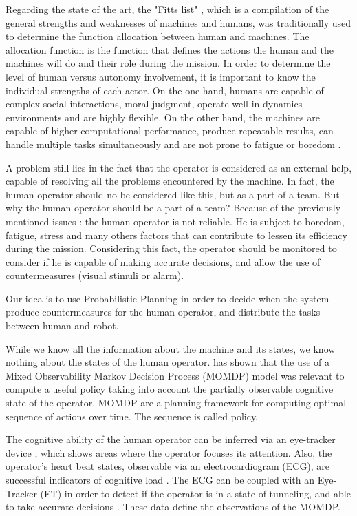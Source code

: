 \documentclass[conference]{IEEEtran}
\begin{document}
Regarding the state of the art, the "Fitts list" \cite{FITTS}, 
which is a compilation of the general strengths and weaknesses of machines and humans, 
was traditionally used to determine the function allocation between human and machines. 
The allocation function is the function that defines the actions the human and the machines will do and their role during the mission. 
In order to determine the level of human versus autonomy involvement, it is important to know the individual strengths of each actor. On the one hand, humans are capable of complex social interactions, moral judgment, operate well in dynamics environments and are highly flexible. On the other hand, the machines are capable of higher computational performance, produce repeatable results, can handle multiple tasks simultaneously and are not prone to fatigue or boredom \cite{NOTHWANG}.

A problem still lies in the fact that the operator is considered as an external help, 
capable of resolving all the problems encountered by the machine. 
In fact, the human operator should no be considered like this, but as a part of a team.
But why the human operator should be a part of a team? Because of the previously mentioned issues : the human operator is not reliable. He is subject to boredom, fatigue, stress and many others factors that can contribute to lessen its efficiency during the mission.
Considering this fact, the operator should be monitored to consider if he is capable of making accurate decisions, and allow the use of countermeasures (visual stimuli or alarm). 

Our idea is to use Probabilistic Planning in order to decide when the system produce countermeasures for the human-operator, and distribute the tasks between human and robot.

While we know all the information about the machine and its states, we know nothing about the states of the human operator. 
\cite{SOUZA} has shown that the use of a Mixed Observability Markov Decision Process (MOMDP) \cite{ONG} 
 model was relevant to compute a useful policy taking into account the partially observable cognitive state of the operator.
MOMDP are a planning framework for computing optimal sequence of actions over time. The sequence is called policy.

The cognitive ability of the human operator can be inferred via an eye-tracker device \cite{GATEAU}, 
which shows areas where the operator focuses its attention. Also, the operator's heart beat states, observable via an electrocardiogram (ECG), 
are successful indicators of cognitive load \cite{WILSON}. 
The ECG can be coupled with an Eye-Tracker (ET) in order to detect if the operator is in a state of tunneling, and able to take accurate decisions . %
These data define the observations of the MOMDP.
\end{document}
